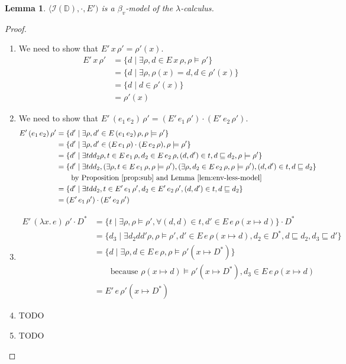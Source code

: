 \documentclass{tufte-handout}
\newcommand{\LAM}[1]{\lambda #1.\,}
\newcommand{\APP}[0]{\,}
\newcommand{\ext}[3]{#3(#1{\mapsto}#2)}
\newtheorem{lemma}[theorem]{Lemma}
\begin{document}
\begin{lemma}
$\langle \mathcal{I}(\mathbb{D}), \cdot, E')$ is a $\beta_v$-model of
  the $\lambda$-calculus.
\end{lemma}
\begin{proof}\ 
\begin{enumerate}
\item We need to show that $E'\,x\,\rho' = \rho'(x)$.
  \begin{align*}
    E'\,x\,\rho' &=
    \{ d \mid \exists \rho, d \in E\,x\,\rho, \rho \models \rho'\}\\
    &= \{ d \mid \exists \rho, \rho(x)=d, d \in \rho'(x) \} \\
    &= \{ d \mid d \in \rho'(x) \} \\
    &= \rho'(x)
  \end{align*}
\item We need to show that
      $E'\,(e_1\APP e_2)\,\rho' = (E'\,e_1\,\rho') \cdot (E'\,e_2\,\rho')$.
  \begin{align*}
    E'\,(e_1\APP e_2)\,\rho' &=
    \{ d' \mid \exists \rho, d' \in E\,(e_1\APP e_2)\,\rho,
    \rho \models \rho'\} \\
    &= \{ d' \mid \exists \rho, d' \in (E\,e_1\,\rho) \cdot (E\,e_2\,\rho),
    \rho \models \rho' \} \\
    &= \{ d' \mid \exists  t d d_2 \rho,
    t \in E\,e_1\,\rho,  d_2 \in E\,e_2\,\rho, 
    (d,d') \in t, d \sqsubseteq d_2,
    \rho \models \rho' \} \\
    &= \{ d' \mid
    \exists t d d_2,
    (\exists \rho, t \in E\,e_1\,\rho,\rho\models\rho'),
    (\exists \rho, d_2 \in E\,e_2\,\rho,\rho \models \rho'),
    (d,d') \in t, d \sqsubseteq d_2
    \} \\
    & \qquad \text{by Proposition~\ref{prop:sub} and Lemma~\ref{lem:env-less-model}}\\
    &= \{ d' \mid
    \exists t d d_2, t \in E'\,e_1\,\rho',  d_2 \in E'\,e_2\,\rho',
    (d,d') \in t, d \sqsubseteq d_2
    \} \\
    &= (E'\,e_1\,\rho') \cdot (E'\,e_2\,\rho')
  \end{align*}
\item
  \begin{align*}
    E'\,(\LAM{x}e)\,\rho' \cdot D^{*} &=
    \{ t \mid \exists \rho, \rho\models\rho',
          \forall (d,d)\in t, d' \in E\,e\,\ext{x}{d}{\rho} \} \cdot D^{*} \\
   &= \{ d_3 \mid \exists d_2 d d' \rho,
                  \rho\models\rho',
                   d' \in E\,e\,\ext{x}{d}{\rho},
                  d_2 \in D^{*}, d \sqsubseteq d_2, d_3 \sqsubseteq d' \} \\
   &= \{ d \mid \exists \rho, d \in E\,e\,\rho, \rho \models \ext{x}{D^{*}}{\rho'}\} \\
   & \qquad\text{because } \ext{x}{d}{\rho}\models\ext{x}{D^{*}}{\rho'},
      d_3 \in E\,e\,\ext{x}{d}{\rho} \\
   &= E'\,e\,\ext{x}{D^{*}}{\rho'}
  \end{align*}
\item TODO
\item TODO
\end{enumerate}
\end{proof}
\end{document}
